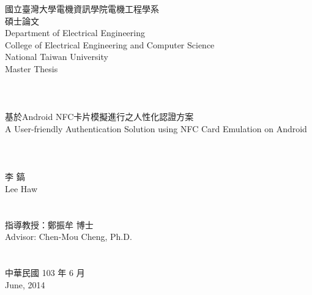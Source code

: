 \documentclass[12pt]{report}
\begin{document}
\onehalfspacing

\begin{titlepage}
\begin{center}

\begin{CJK}{UTF8}{bkai}
\Large{{國立臺灣大學電機資訊學院電機工程學系\\碩士論文}}\\
\large{{Department of Electrical Engineering}}\\
\large{College of Electrical Engineering and Computer Science}\\
\Large{{National Taiwan University}}\\
\Large{{Master Thesis}}\\

\hspace*{1cm}~\\
\hspace*{1cm}~\\
\hspace*{1cm}~\\
\Large{基於Android NFC卡片模擬進行之人性化認證方案\\
A User-friendly Authentication Solution using NFC Card Emulation on Android }\\
\hspace*{1cm}~\\
\hspace*{1cm}~\\
\hspace*{1cm}~\\

\Large{李  鎬\\Lee Haw}\\
\hspace*{1cm}~\\
\hspace*{1cm}~\\

\Large{指導教授：鄭振牟 博士\\Advisor: Chen-Mou Cheng, Ph.D.}\\
\hspace*{1cm}~\\
\hspace*{1cm}~\\


\Large{中華民國 103 年 6 月\\June, 2014}\\

\end{CJK}
\end{center}
\end{titlepage}
\end{document}
